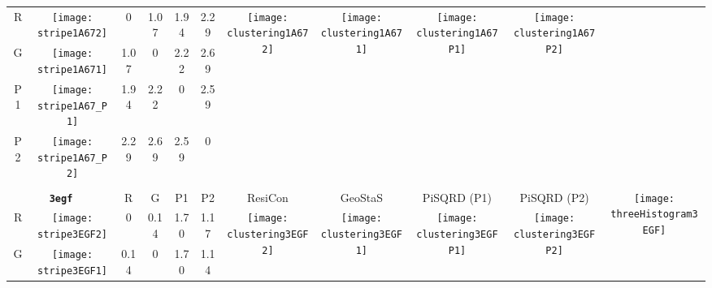 \documentclass[a4paper,11pt,twoside]{book}%
\begin{document}
\begin{appendices}
\begin{sidewaystable}[h!]
\begin{tabular*}{4cm}{cc|c|c|c|c|c|c|c|c|c|}
\cline{1-10}
\multicolumn{1}{|c|}{R} & \texttt{[image: stripe1A672]} & 0 & 1.07 & 1.94 & 2.29 & \multirow{4}{*}{\vspace{-0.3cm}\texttt{[image: clustering1A672]}} & \multirow{4}{*}{\vspace{-0.3cm}\texttt{[image: clustering1A671]}} & \multirow{4}{*}{\vspace{-0.3cm}\texttt{[image: clustering1A67P1]}} & \multirow{4}{*}{\vspace{-0.3cm}\texttt{[image: clustering1A67P2]}} &  \multirow{5}{*}{} \\
\cline{1-6}
\multicolumn{1}{|c|}{G} & \texttt{[image: stripe1A671]} & 1.07 & 0 & 2.22 & 2.69 & \multirow{4}{*}{} & \multirow{4}{*}{} & \multirow{4}{*}{} & \multirow{4}{*}{} & \multirow{5}{*}{} \\
\cline{1-6}
\multicolumn{1}{|c|}{P1} & \texttt{[image: stripe1A67\_P1]} & 1.94 & 2.22 & 0 & 2.59 & \multirow{4}{*}{} & \multirow{4}{*}{} & \multirow{4}{*}{} & \multirow{4}{*}{} & \multirow{5}{*}{}  \\
\cline{1-6}
\multicolumn{1}{|c|}{P2} & \texttt{[image: stripe1A67\_P2]} & 2.29 & 2.69 & 2.59 & 0 & \multirow{4}{*}{} & \multirow{4}{*}{} & \multirow{4}{*}{} & \multirow{4}{*}{} & \multirow{5}{*}{}  \\
\cline{1-11}
\\
\cline{1-11}
\multicolumn{2}{|c|}{{\bf \texttt{3egf}}} & R & G & P1 & P2 & ResiCon & GeoStaS & PiSQRD (P1) & PiSQRD (P2) & \multirow{5}{*}{\vspace{-0.15cm}\texttt{[image: threeHistogram3EGF]}}  \\
\cline{1-10}
\multicolumn{1}{|c|}{R} & \texttt{[image: stripe3EGF2]} & 0 & 0.14 & 1.70 & 1.17 & \multirow{4}{*}{\vspace{-0.3cm}\texttt{[image: clustering3EGF2]}} & \multirow{4}{*}{\vspace{-0.3cm}\texttt{[image: clustering3EGF1]}} & \multirow{4}{*}{\vspace{-0.3cm}\texttt{[image: clustering3EGFP1]}} & \multirow{4}{*}{\vspace{-0.3cm}\texttt{[image: clustering3EGFP2]}} &  \multirow{5}{*}{} \\
\cline{1-6}
\multicolumn{1}{|c|}{G} & \texttt{[image: stripe3EGF1]} & 0.14 & 0 & 1.70 & 1.14 & \multirow{4}{*}{} & \multirow{4}{*}{} & \multirow{4}{*}{} & \multirow{4}{*}{} & \multirow{5}{*}{} \\

\end{tabular*}
\end{sidewaystable}
\end{appendices}
\end{document}
